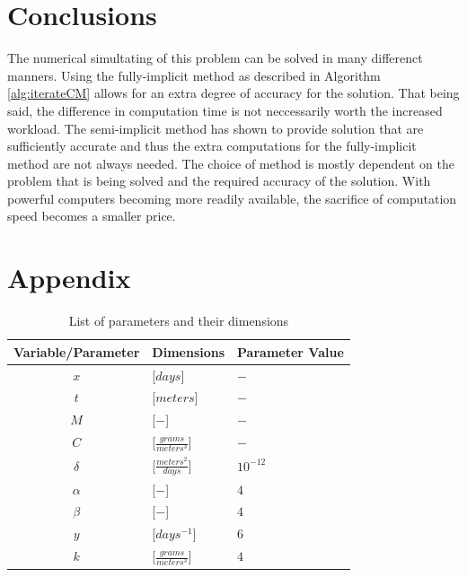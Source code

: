 \documentclass{llncs}
\begin{document}
\section{Conclusions}
  The numerical simultating of this problem can be solved in many differenct manners.
  Using the fully-implicit method as described in Algorithm \ref{alg:iterateCM} allows for an extra degree of accuracy for the solution.
  That being said, the difference in computation time is not neccessarily worth the increased workload.
  The semi-implicit method has shown to provide solution that are sufficiently accurate and thus the extra computations for the fully-implicit method are not always needed.
  The choice of method is mostly dependent on the problem that is being solved and the required accuracy of the solution.
  With powerful computers becoming more readily available, the sacrifice of computation speed becomes a smaller price.


\section*{Appendix}
  \begin{table}[h!bt]
    \centering
    \begin{tabular}{|c | l | l|}
      \hline 
      Variable/Parameter & Dimensions & Parameter Value\\
      \hline 
      $x$ & [$days$] & $-$ \\
      $t$ & [$meters$] & $-$ \\
      $ M  $ & [$-$] & $-$\\
      $ C  $ & [$\frac{grams}{meters^3}$]  & $-$\\
      $ {\delta} $ & [$\frac{meters^2}{days}$] & $10^{-12}$ \\
      $ \alpha $ & [$-$] & $4$\\
      $ \beta  $ & [$-$] & $4$\\
      $ {y}$ & [$days^{-1} $] & $6$ \\
      $ {k}  $ & [$\frac{grams}{meters^3}$] & $4$ \\
      \hline
    \end{tabular}
    \caption{List of parameters and their dimensions}
        \label{tab:varDimensions}
  \end{table}

\newpage



\end{document}
